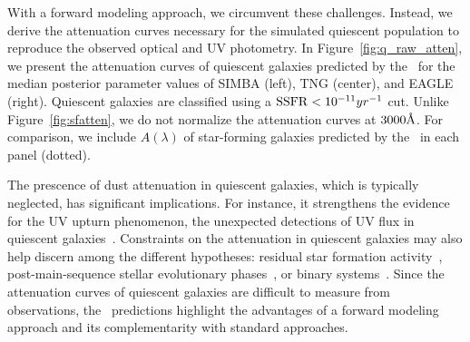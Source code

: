 With a forward modeling approach, we circumvent these challenges. 
Instead, we derive the attenuation curves necessary for the simulated quiescent
population to reproduce the observed optical and UV photometry. 
In Figure~\ref{fig:q_raw_atten}, we present the attenuation curves of
quiescent galaxies predicted by the \eda~for the median posterior parameter
values of SIMBA (left), TNG (center), and EAGLE (right). 
Quiescent galaxies are classified using a ${\rm SSFR} < 10^{-11}{yr}^{-1}$ cut. 
Unlike Figure~\ref{fig:sfatten}, we do not normalize the attenuation curves at $3000\AA$. 
For comparison, we include $A(\lambda)$ of star-forming galaxies predicted
by the \eda~in each panel (dotted).

The prescence of dust attenuation in quiescent galaxies, which is typically
neglected, has significant implications.  
For instance, it strengthens the evidence for the UV upturn phenomenon, the
unexpected detections of UV flux in quiescent galaxies~\citep[\eg][]{code1969,
oconnell1999, lecras2016, ali2018, dantas2021}. 
Constraints on the attenuation in quiescent galaxies may also help discern
among the different hypotheses: residual star formation
activity~\citep[\eg~][]{kaviraj2007}, post-main-sequence stellar evolutionary
phases~\citep[\eg~][]{yi1997}, or binary systems~\citep[\eg~][]{han2007}.
Since the attenuation curves of quiescent galaxies are difficult to measure
from observations, the \eda~predictions highlight the advantages of a
forward modeling approach and its complementarity with standard approaches. 


